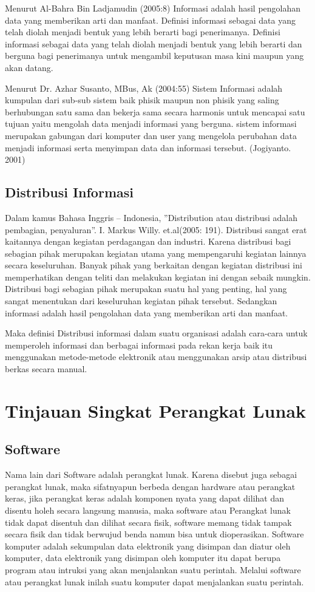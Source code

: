 \documentclass{jtetiproposalskripsi}
\begin{document}
Menurut Al-Bahra Bin Ladjamudin (2005:8) Informasi adalah hasil pengolahan data yang memberikan arti dan manfaat. Definisi informasi sebagai data yang telah diolah menjadi bentuk yang lebih berarti bagi penerimanya. Definisi informasi sebagai data yang telah diolah menjadi bentuk yang lebih berarti dan berguna bagi penerimanya untuk mengambil keputusan masa kini maupun yang akan datang.

Menurut Dr. Azhar Susanto, MBus, Ak (2004:55) Sistem Informasi adalah kumpulan dari sub-sub sistem baik phisik maupun non phisik yang saling berhubungan satu sama dan bekerja sama secara harmonis untuk mencapai satu tujuan yaitu mengolah data menjadi informasi yang berguna. sistem informasi merupakan gabungan dari komputer dan user yang mengelola perubahan data menjadi informasi serta menyimpan data dan informasi tersebut. (Jogiyanto. 2001)


\subsection{Distribusi Informasi}
Dalam kamus Bahasa Inggris – Indonesia, ”Distribution atau distribusi adalah pembagian, penyaluran”. I. Markus Willy. et.al(2005: 191). Distribusi sangat erat kaitannya dengan kegiatan perdagangan dan industri. Karena distribusi bagi sebagian pihak merupakan kegiatan utama yang mempengaruhi kegiatan lainnya secara keseluruhan. Banyak pihak yang berkaitan dengan kegiatan distribusi ini memperhatikan dengan teliti dan melakukan kegiatan ini dengan sebaik mungkin. Distribusi bagi sebagian pihak merupakan suatu hal yang penting, hal yang sangat menentukan dari keseluruhan kegiatan pihak tersebut. Sedangkan informasi adalah hasil pengolahan data yang memberikan arti dan manfaat. 

Maka definisi Distribusi informasi dalam suatu organisasi adalah cara-cara untuk memperoleh informasi dan berbagai informasi pada rekan kerja baik itu menggunakan metode-metode elektronik atau menggunakan arsip atau distribusi berkas secara manual.


\section{Tinjauan Singkat Perangkat Lunak}
\subsection{Software}
Nama lain dari Software adalah perangkat lunak. Karena disebut juga sebagai perangkat lunak, maka sifatnyapun berbeda dengan hardware atau perangkat keras, jika perangkat keras adalah komponen nyata yang dapat dilihat dan disentu holeh secara langsung manusia, maka software atau Perangkat lunak tidak dapat disentuh dan dilihat secara fisik, software memang tidak tampak secara fisik dan tidak berwujud  benda namun  bisa untuk dioperasikan. Software komputer adalah sekumpulan data elektronik yang disimpan dan diatur oleh komputer, data elektronik yang disimpan oleh komputer itu dapat berupa program atau intruksi yang akan menjalankan suatu perintah. Melalui software atau perangkat lunak inilah suatu komputer dapat menjalankan suatu perintah.
\end{document}

